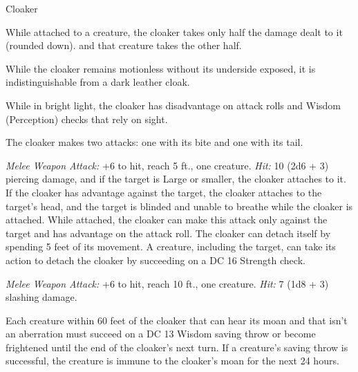 \documentclass[10pt,a4paper,twoside,bg=none,twocolumn,openany,nodeprecatedcode]{dndbook}
\begin{document}
\begin{DndMonster}[float=t]{Cloaker}
\DndMonsterBasics[
armor-class = {14 (natural armor)},
hit-points = {\DndDice{12d10 + 12}},
speed = {10 ft., fly 40 ft.}
]
\DndMonsterAbilityScores[
 str = 17,
 dex = 15,
 con = 12,
 int = 13,
 wis = 12,
 cha = 14
]
\DndMonsterDetails[
skills = {Stealth +5},
senses = {darkvision 60 ft., passive perception 11},
languages = {Deep Speech, Undercommon},
challenge = 8,
]
While attached to a creature, the cloaker takes only half the damage dealt to it (rounded down). and that creature takes the other half.

While the cloaker remains motionless without its underside exposed, it is indistinguishable from a dark leather cloak.

While in bright light, the cloaker has disadvantage on attack rolls and Wisdom (Perception) checks that rely on sight.

\par
{}
The cloaker makes two attacks: one with its bite and one with its tail.

\textsl{Melee Weapon Attack:} +6 to hit, reach 5 ft., one creature. \textsl{Hit:} 10 (2d6 + 3) piercing damage, and if the target is Large or smaller, the cloaker attaches to it. If the cloaker has advantage against the target, the cloaker attaches to the target's head, and the target is blinded and unable to breathe while the cloaker is attached. While attached, the cloaker can make this attack only against the target and has advantage on the attack roll. The cloaker can detach itself by spending 5 feet of its movement. A creature, including the target, can take its action to detach the cloaker by succeeding on a DC 16 Strength check.

\textsl{Melee Weapon Attack:} +6 to hit, reach 10 ft., one creature. \textsl{Hit:} 7 (1d8 + 3) slashing damage.

Each creature within 60 feet of the cloaker that can hear its moan and that isn't an aberration must succeed on a DC 13 Wisdom saving throw or become frightened until the end of the cloaker's next turn. If a creature's saving throw is successful, the creature is immune to the cloaker's moan for the next 24 hours.


\end{DndMonster}
\end{document}
